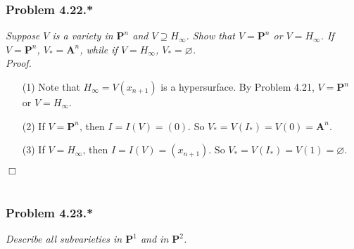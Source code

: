 \documentclass{article}
\begin{document}
\subsubsection*{Problem 4.22.*}
\emph{Suppose $V$ is a variety in $\mathbf{P}^{n}$ and $V \supseteq H_{\infty}$.
Show that $V = \mathbf{P}^{n}$ or $V = H_{\infty}$.
If $V = \mathbf{P}^{n}$, $V_{*} = \mathbf{A}^{n}$,
while if $V = H_{\infty}$, $V_{*} = \varnothing$.} \\



\emph{Proof.}
\begin{enumerate}
\item[(1)]
  Note that $H_{\infty} = V(x_{n+1})$ is a hypersurface.
  By Problem 4.21, $V = \mathbf{P}^{n}$ or $V = H_{\infty}$.

\item[(2)]
  If $V = \mathbf{P}^{n}$, then $I = I(V) = (0)$.
  So $V_{*} = V(I_{*}) = V(0) = \mathbf{A}^{n}$.

\item[(3)]
  If $V = H_{\infty}$, then $I = I(V) = (x_{n+1})$.
  So $V_{*} = V(I_{*}) = V(1) = \varnothing$.
\end{enumerate}
$\Box$ \\\\






\subsubsection*{Problem 4.23.*}
\emph{Describe all subvarieties in $\mathbf{P}^{1}$ and in $\mathbf{P}^{2}$.} \\
\end{document}
